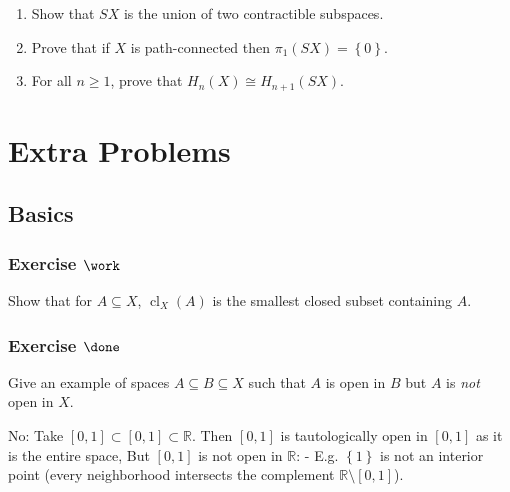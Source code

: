 \begin{enumerate}
\def\labelenumi{\alph{enumi}.}
\item
  Show that \(SX\) is the union of two contractible subspaces.
\item
  Prove that if \(X\) is path-connected then
  \(\pi_1 (SX) = \left\{{0}\right\}\).
\item
  For all \(n \geq 1\), prove that \(H_{n} (X) \cong H_{n+1} (SX)\).
\end{enumerate}

\hypertarget{extra-problems}{%
\section{Extra Problems}\label{extra-problems}}

\hypertarget{basics}{%
\subsection{Basics}\label{basics}}

\hypertarget{exercise-work}{%
\subsubsection{\texorpdfstring{Exercise
\(\work\)}{Exercise \textbackslash work}}\label{exercise-work}}

Show that for \(A\subseteq X\), \(\operatorname{cl}_X(A)\) is the
smallest closed subset containing \(A\).

\hypertarget{exercise-done}{%
\subsubsection{\texorpdfstring{Exercise
\(\done\)}{Exercise \textbackslash done}}\label{exercise-done}}

Give an example of spaces \(A\subseteq B \subseteq X\) such that \(A\)
is open in \(B\) but \(A\) is \emph{not} open in \(X\).

\begin{solution}

\hfill

\begin{concept}

\hfill

\end{concept}

No: Take \([0, 1] \subset [0, 1] \subset {\mathbb{R}}\). Then \([0, 1]\)
is tautologically open in \([0, 1]\) as it is the entire space, But
\([0, 1]\) is not open in \({\mathbb{R}}\): - E.g.
\(\left\{{1}\right\}\) is not an interior point (every neighborhood
intersects the complement \({\mathbb{R}}\setminus[0, 1]\)).

\end{solution}

